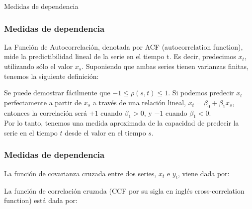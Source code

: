 \documentclass[xcolor=(list of options)]{beamer}
\begin{document}
\begin{section}{Medidas de dependencia}
\begin{frame}
\end{frame}

\begin{frame}
\frametitle{Medidas de dependencia}

La Funci\'on de Autocorrelaci\'on, denotada por ACF (autocorrelation function),  mide la predictibilidad lineal de la serie en el tiempo t. Es decir, predecimos $x_t$, utilizando s\'olo el valor $x_s$. Suponiendo que ambas series tienen varianzas finitas, tenemos la siguiente definici\'on:

\vspace{5mm}

Se puede demostrar f\'acilmente que $-1 \le \rho(s,t) \le 1$. Si podemos predecir $x_t$ perfectamente a partir de $x_s$ a trav\'es de una relaci\'on lineal, $x_t = \beta_0 + \beta_1 x_s$, entonces la correlaci\'on ser\'a $+1$ cuando $\beta_1 > 0$, y $-1$ cuando $\beta_1 < 0$. \\
Por lo tanto, tenemos una medida aproximada de la capacidad de predecir la serie en el tiempo $t$ desde el valor en el tiempo $s$.

\end{frame}

\begin{frame}
\frametitle{Medidas de dependencia}

La funci\'on de covarianza cruzada entre dos series, $x_t$ e $y_t$, viene dada por:
\vspace{5mm}

La funci\'on de correlaci\'on cruzada (CCF por su sigla en ingl\'es cross-correlation function) est\'a dada por:
\vspace{5mm}


\end{frame}
\end{section}
\end{document}
